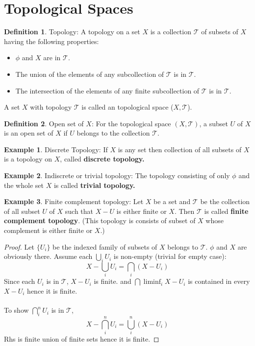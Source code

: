 \documentclass[12pt,reqno]{amsart}
\theoremstyle{plain}
\theoremstyle{definition}
\newtheorem{defn}{Definition}
\newtheorem{eg}{Example}
\begin{document}
\section{Topological Spaces}
\begin{defn}
    Topology: A topology on a set $X$ is a collection $\mathcal T$ of subsets of $X$ having the following properties:
\begin{itemize}
    \item $\phi$ and $X$ are in $\mathcal T$.
    \item The union of the elements of any subcollection of $\mathcal T$ is in $\mathcal T$.
    \item The intersection of the elements of any finite subcollection of $\mathcal T$ is in $\mathcal T$.
\end{itemize}
\end{defn}
A set $X$ with topology $\mathcal T$ is called an topological space ($X,\mathcal T$).
\begin{defn}
    Open set of $X$: For the topological space $(X, \mathcal T)$, a subset $U$ of $X$ is an open set of $X$ if $U$ belongs to the collection $\mathcal T$.
\end{defn}
\begin{eg}
    Discrete Topology: If $X$ is any set then collection of all subsets of $X$ is a topology on $X$, called {\bf discrete topology.}
\end{eg}
\begin{eg}
    Indiscrete or trivial topology: The topology consisting of only $\phi$ and the whole set $X$ is called {\bf trivial topology.}
\end{eg}
\begin{eg}
    Finite complement topology: Let $X$ be a set and $\mathcal{T}$ be the collection of all subset $U$ of $X$ such that $X - U$ is either finite or $X$. Then $\mathcal{T}$ is called {\bf finite complement topology}. (This topology is consists of subset of $X$ whose complement is either finite or $X$.)
\end{eg}
\begin{proof}
    Let $\{U_{i}\}$ be the indexed family of subsets of $X$ belongs to $\mathcal{T}$. $\phi$ and $X$ are obviously there. Assume each $\bigcup\limits_i U_i$ is non-empty (trivial for empty case): 
    $$X - \bigcup\limits_i U_i = \bigcap\limits_i(X - U_i)$$
    Since each $U_i$ is in $\mathcal{T}$, $X - U_i$ is finite. and $\bigcap\liminf_i X - U_i$ is contained in every $X - U_i$ hence it is finite.\\ \\
    To show $\bigcap\limits_i^n U_i$ is in $\mathcal{T}$, 
    $$ X - \bigcap\limits_i^n U_i = \bigcup\limits_i^n (X - U_i) $$
    Rhs is finite union of finite sets hence it is finite.
\end{proof}
\end{document}
